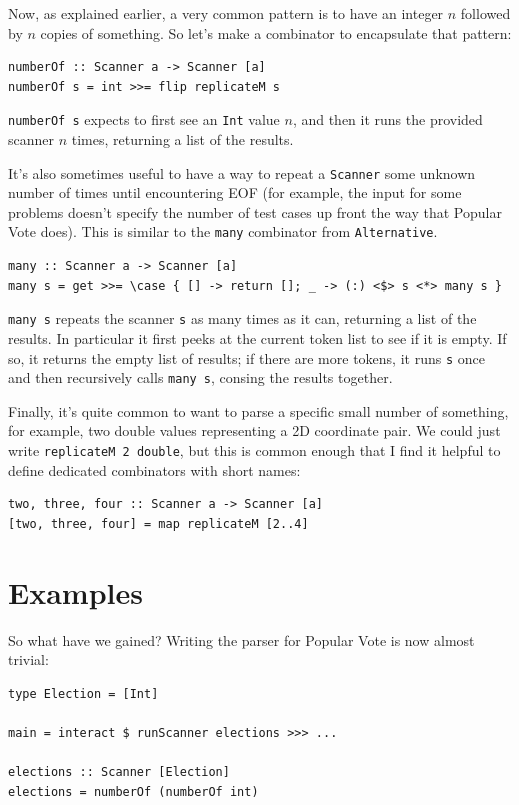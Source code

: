 \documentclass{book}
\newcommand{\h}[1]{\texttt{#1}}
\begin{document}
Now, as explained earlier, a very common pattern is to have an
integer $n$ followed by $n$ copies of something.  So let's make a
combinator to encapsulate that pattern:
\begin{verbatim}
numberOf :: Scanner a -> Scanner [a]
numberOf s = int >>= flip replicateM s
\end{verbatim}
\h{numberOf s} expects to first see an \h{Int} value $n$, and then it runs
the provided scanner $n$ times, returning a list of the results.

It's also sometimes useful to have a way to repeat a \h{Scanner} some
unknown number of times until encountering EOF (for example, the input
for some problems doesn't specify the number of test cases up front
the way that Popular Vote does).  This is similar to the \h{many}
combinator from \h{Alternative}.
\begin{verbatim}
many :: Scanner a -> Scanner [a]
many s = get >>= \case { [] -> return []; _ -> (:) <$> s <*> many s }
\end{verbatim}
\h{many s} repeats the scanner \h{s} as many times as it can, returning a
list of the results.  In particular it first peeks at the current
token list to see if it is empty.  If so, it returns the empty list of
results; if there are more tokens, it runs \h{s} once and then
recursively calls \h{many s}, consing the results together.

Finally, it's quite common to want to parse a specific small number of
something, for example, two double values representing a 2D coordinate pair.
We could just write \h{replicateM 2 double}, but this is common enough
that I find it helpful to define dedicated combinators with short
names:
\begin{verbatim}
two, three, four :: Scanner a -> Scanner [a]
[two, three, four] = map replicateM [2..4]
\end{verbatim}


\section{Examples}

So what have we gained?  Writing the parser for Popular Vote is now
almost trivial:
\begin{verbatim}
type Election = [Int]

main = interact $ runScanner elections >>> ...

elections :: Scanner [Election]
elections = numberOf (numberOf int)
\end{verbatim}
\end{document}
